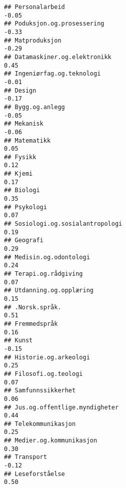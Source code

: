 \documentclass[
]{article}
\begin{document}
\begin{verbatim}
## Personalarbeid                                                                   -0.05
## Poduksjon.og.prosessering                                                        -0.33
## Matproduksjon                                                                    -0.29
## Datamaskiner.og.elektronikk                                                       0.45
## Ingeniørfag.og.teknologi                                                         -0.01
## Design                                                                           -0.17
## Bygg.og.anlegg                                                                   -0.05
## Mekanisk                                                                         -0.06
## Matematikk                                                                        0.05
## Fysikk                                                                            0.12
## Kjemi                                                                             0.17
## Biologi                                                                           0.35
## Psykologi                                                                         0.07
## Sosiologi.og.sosialantropologi                                                    0.19
## Geografi                                                                          0.29
## Medisin.og.odontologi                                                             0.24
## Terapi.og.rådgiving                                                               0.07
## Utdanning.og.opplæring                                                            0.15
## .Norsk.språk.                                                                     0.51
## Fremmedspråk                                                                      0.16
## Kunst                                                                            -0.15
## Historie.og.arkeologi                                                             0.25
## Filosofi.og.teologi                                                               0.07
## Samfunnssikkerhet                                                                 0.06
## Jus.og.offentlige.myndigheter                                                     0.44
## Telekommunikasjon                                                                 0.25
## Medier.og.kommunikasjon                                                           0.30
## Transport                                                                        -0.12
## Leseforståelse                                                                    0.50

\end{verbatim}
\end{document}
